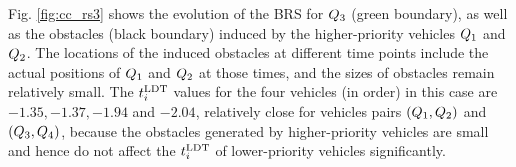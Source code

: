 Fig. \ref{fig:cc_rs3} shows the evolution of the BRS for $Q_3$ (green boundary), as well as the obstacles (black boundary) induced by the higher-priority vehicles $Q_1$ and $Q_2$. The locations of the induced obstacles at different time points include the actual positions of $Q_1$ and $Q_2$ at those times, and the sizes of obstacles remain relatively small. The $t^\text{LDT}_i$ values for the four vehicles (in order) in this case are $-1.35, -1.37, -1.94$ and $-2.04$, relatively close for vehicles pairs $(Q_1, Q_2)$ and $(Q_3, Q_4)$, because the obstacles generated by higher-priority vehicles are small and hence do not affect the $t^\text{LDT}_i$ of lower-priority vehicles significantly.